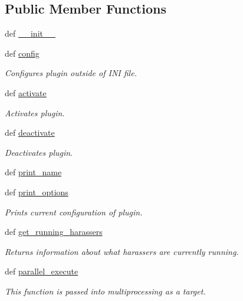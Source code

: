 \subsection*{Public Member Functions}
\begin{DoxyCompactItemize}
\item 
def \hyperlink{classHarasser_1_1Harasser_a2be9f5195e1163d8d7504545ecce5392}{\-\_\-\-\_\-init\-\_\-\-\_\-}
\item 
def \hyperlink{classHarasser_1_1Harasser_a1c6d6c9fd9c045fda3739fc492529f8a}{config}
\begin{DoxyCompactList}\small\item\em Configures plugin outside of I\-N\-I file. \end{DoxyCompactList}\item 
def \hyperlink{classHarasser_1_1Harasser_a640d9b23c457a325faf5b907eb5bdc45}{activate}
\begin{DoxyCompactList}\small\item\em Activates plugin. \end{DoxyCompactList}\item 
def \hyperlink{classHarasser_1_1Harasser_a2a588949b62a2b366f37994e71fb2fb1}{deactivate}
\begin{DoxyCompactList}\small\item\em Deactivates plugin. \end{DoxyCompactList}\item 
def \hyperlink{classHarasser_1_1Harasser_a5b5cb263e3c62a9de749cd0424262703}{print\-\_\-name}
\item 
def \hyperlink{classHarasser_1_1Harasser_a732567c8a1913fca8ff1ca0c65b0540b}{print\-\_\-options}
\begin{DoxyCompactList}\small\item\em Prints current configuration of plugin. \end{DoxyCompactList}\item 
def \hyperlink{classHarasser_1_1Harasser_ad128bc111a91fd099e6f20db5320ca36}{get\-\_\-running\-\_\-harassers}
\begin{DoxyCompactList}\small\item\em Returns information about what harassers are currently running. \end{DoxyCompactList}\item 
def \hyperlink{classHarasser_1_1Harasser_a02afcd1243832ad692db3ecbf8b83950}{parallel\-\_\-execute}
\begin{DoxyCompactList}\small\item\em This function is passed into multiprocessing as a target. \end{DoxyCompactList}\item 

\end{DoxyCompactItemize}
